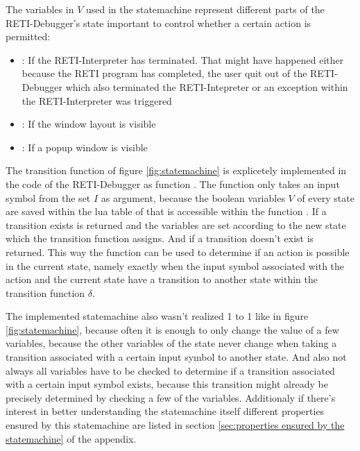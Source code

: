 \documentclass{report}
\begin{document}
The variables in $V$ used in the statemachine represent different parts of the RETI-Debugger's state important to control whether a certain action is permitted:

\begin{itemize}
	\item {}: If the RETI-Interpreter has terminated. That might have happened either because the RETI program has completed, the user quit out of the RETI-Debugger which also terminated the RETI-Intepreter or an exception within the RETI-Interpreter was triggered
	\item {}: If the window layout is visible
	\item {}: If a popup window is visible
\end{itemize}

The transition function of figure \ref{fig:statemachine} is explicetely implemented in the code of the RETI-Debugger as function . The function only takes an input symbol  from the set $I$ as argument, because the boolean variables $V$ of every state are saved within the lua table of  that is accessible within the function . If a transition exists  is returned and the variables are set according to the new state which the transition function assigns. And if a transition doesn't exist  is returned. This way the function  can be used to determine if an action is possible in the current state, namely exactly when the input symbol associated with the action and the current state have a transition to another state within the transition function $\delta$.

The implemented statemachine also wasn't realized 1 to 1 like in figure \ref{fig:statemachine}, because often it is enough to only change the value of a few variables, because the other variables of the state never change when taking a transition associated with a certain input symbol to another state. And also not always all variables have to be checked to determine if a transition associated with a certain input symbol exists, because this transition might already be precisely determined by checking a few of the variables. Additionaly if there's interest in better understanding the statemachine itself different properties ensured by this statemachine are listed in section \ref{sec:properties ensured by the statemachine} of the appendix.
\end{document}
